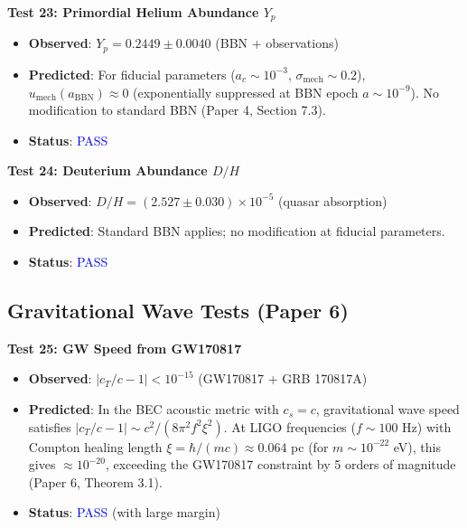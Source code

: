 \documentclass[11pt,a4paper]{article}
\newcommand{\umech}{\ensuremath{u_{\mathrm{mech}}}}
\theoremstyle{definition}
\theoremstyle{remark}
\begin{document}
\textbf{Test 23: Primordial Helium Abundance $Y_p$}

\begin{itemize}[leftmargin=*, itemsep=0.1em]
\item \textbf{Observed}: $Y_p = 0.2449 \pm 0.0040$ (BBN + observations) \cite{Aver2015}
\item \textbf{Predicted}: For fiducial parameters ($a_c \sim 10^{-3}$, $\sigma_{\mathrm{mech}} \sim 0.2$), $\umech(a_{\mathrm{BBN}}) \approx 0$ (exponentially suppressed at BBN epoch $a \sim 10^{-9}$). No modification to standard BBN (Paper 4, Section 7.3).
\item \textbf{Status}: \textcolor{blue}{PASS}
\end{itemize}

\textbf{Test 24: Deuterium Abundance $D/H$}

\begin{itemize}[leftmargin=*, itemsep=0.1em]
\item \textbf{Observed}: $D/H = (2.527 \pm 0.030) \times 10^{-5}$ (quasar absorption) \cite{Cooke2018}
\item \textbf{Predicted}: Standard BBN applies; no modification at fiducial parameters.
\item \textbf{Status}: \textcolor{blue}{PASS}
\end{itemize}

\subsection{Gravitational Wave Tests (Paper 6)}
\label{sec:tests_gw}

\textbf{Test 25: GW Speed from GW170817}

\begin{itemize}[leftmargin=*, itemsep=0.1em]
\item \textbf{Observed}: $|c_T/c - 1| < 10^{-15}$ (GW170817 + GRB 170817A) \cite{Abbott2017}
\item \textbf{Predicted}: In the BEC acoustic metric with $c_s = c$, gravitational wave speed satisfies $|c_T/c - 1| \sim c^2/(8\pi^2 f^2 \xi^2)$. At LIGO frequencies ($f \sim 100$ Hz) with Compton healing length $\xi = \hbar/(mc) \approx 0.064$ pc (for $m \sim 10^{-22}$ eV), this gives $\approx 10^{-20}$, exceeding the GW170817 constraint by 5 orders of magnitude (Paper 6, Theorem 3.1).
\item \textbf{Status}: \textcolor{blue}{PASS} (with large margin)
\end{itemize}
\end{document}
